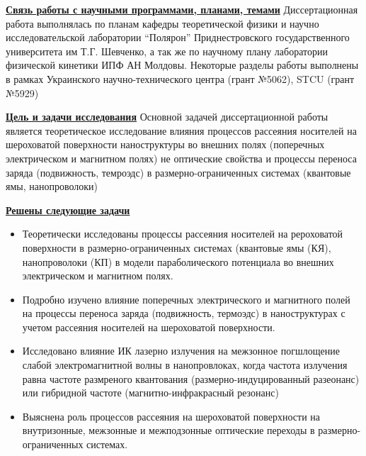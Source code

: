 \underline{\textbf{Связь работы с научными программами, планами, темами}}
Диссертационная работа выполнялась по планам кафедры теоретической физики и научно исследовательской лаборатории “Полярон” Приднестровского государственного университета им Т.Г. Шевченко, а так же по научному плану лаборатории физической кинетики ИПФ АН Молдовы. Некоторые разделы работы выполнены в рамках Украинского научно-технического центра (грант №5062), STCU (грант №5929)

\underline{\textbf{Цель и задачи исследования}}
Основной задачей диссертационной работы является теоретическое исследование влияния процессов рассеяния носителей на шероховатой поверхности наноструктуры во внешних полях (поперечных электрическом и магнитном полях) не оптические свойства и процессы переноса заряда (подвижность, темроэдс) в размерно-ограниченных системах (квантовые ямы, нанопроволоки)

\underline{\textbf{Решены следующие задачи}}
\begin{itemize}
	\item Теоретически исследованы процессы рассеяния носителей на рероховатой поверхности в размерно-ограниченных системах (квантовые ямы (КЯ), нанопроволоки (КП) в модели параболического потенциала во внешних электрическом и магнитном полях.
	\item Подробно изучено влияние поперечных электрического и магнитного полей на процессы переноса заряда (подвижность, термоэдс) в наноструктурах с учетом рассеяния носителей на шероховатой поверхности.
	\item Исследовано влияние ИК лазерно излучения на межзонное погшлощение слабой электромагнитной волны в нанопровлоках, когда частота излучения равна частоте размреного квантования (размерно-индуцированный разеонанс) или гибридной частоте (магнитно-инфракрасный резонанс)
	\item Выяснена роль процессов рассеяния на шероховатой поверхности на внутризонные, межзонные и межподзонные оптические переходы в размерно-ограниченных системах.
\end{itemize}

